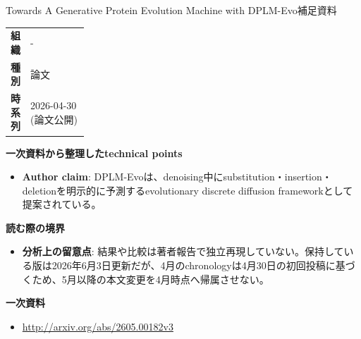\begin{technicalnote}{Towards A Generative Protein Evolution Machine with DPLM-Evo}{補足資料}
\begingroup
\begin{tabularx}{\linewidth}{@{}>{\bfseries}p{0.22\linewidth}X@{}}
組織 & - \\
種別 & 論文 \\
時系列 & 2026-04-30 (論文公開) \\
\end{tabularx}
\smallskip
{\bfseries 一次資料から整理したtechnical points}
\begin{itemize}[leftmargin=1.5em,itemsep=0.35em]
\item \textbf{Author claim}: DPLM-Evoは、denoising中にsubstitution・insertion・deletionを明示的に予測するevolutionary discrete diffusion frameworkとして提案されている。
\end{itemize}
\begin{minipage}{\linewidth}
{\bfseries 読む際の境界}
\begin{itemize}[leftmargin=1.5em,itemsep=0.35em]
\item \textbf{分析上の留意点}: 結果や比較は著者報告で独立再現していない。保持している版は2026年6月3日更新だが、4月のchronologyは4月30日の初回投稿に基づくため、5月以降の本文変更を4月時点へ帰属させない。
\end{itemize}
\begin{samepage}
{\bfseries 一次資料}
\begingroup\sloppy
\begin{itemize}[leftmargin=1.5em,itemsep=0.25em]
\item {\scriptsize\url{http://arxiv.org/abs/2605.00182v3}}
\end{itemize}
\endgroup
\end{samepage}
\end{minipage}
\endgroup
\end{technicalnote}
\medskip
